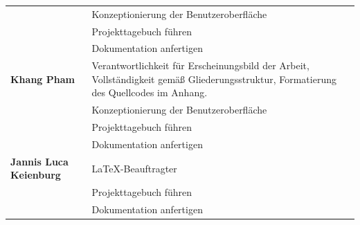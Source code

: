 {\begin{longtable}{|l|p{26em}|}
		& Konzeptionierung der Benutzeroberfläche \\
		& Projekttagebuch führen \\
		& Dokumentation anfertigen \\
	\hline
	\textbf{Khang Pham}
		& Verantwortlichkeit für Erscheinungsbild der Arbeit, Vollständigkeit gemäß Gliederungsstruktur, Formatierung des Quellcodes im Anhang. \\
		& Konzeptionierung der Benutzeroberfläche \\
		& Projekttagebuch führen \\
		& Dokumentation anfertigen \\
	\hline
	\textbf{Jannis Luca Keienburg}
		& LaTeX-Beauftragter \\
		& Projekttagebuch führen \\
		& Dokumentation anfertigen \\
\end{longtable}
}